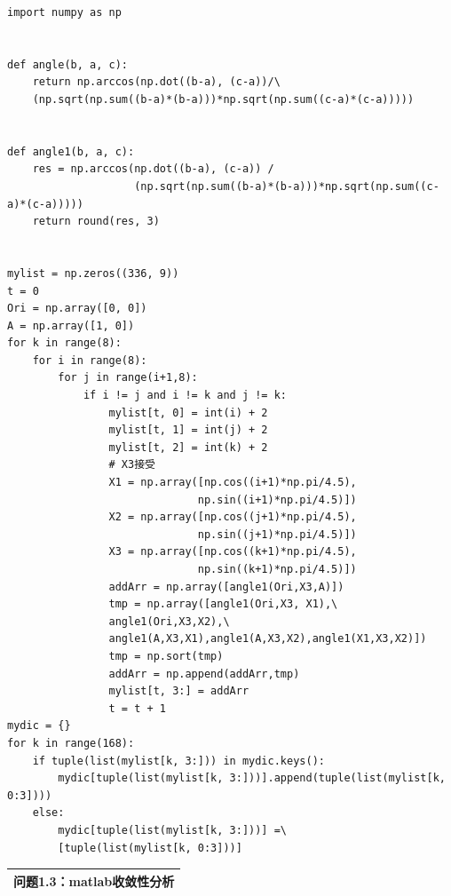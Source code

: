 \documentclass{my_paper}
\begin{document}
\begin{lstlisting}
import numpy as np


def angle(b, a, c):
    return np.arccos(np.dot((b-a), (c-a))/\
    (np.sqrt(np.sum((b-a)*(b-a)))*np.sqrt(np.sum((c-a)*(c-a)))))


def angle1(b, a, c):
    res = np.arccos(np.dot((b-a), (c-a)) /
                    (np.sqrt(np.sum((b-a)*(b-a)))*np.sqrt(np.sum((c-a)*(c-a)))))
    return round(res, 3)


mylist = np.zeros((336, 9))
t = 0
Ori = np.array([0, 0])
A = np.array([1, 0])
for k in range(8):
    for i in range(8):
        for j in range(i+1,8):
            if i != j and i != k and j != k:
                mylist[t, 0] = int(i) + 2
                mylist[t, 1] = int(j) + 2
                mylist[t, 2] = int(k) + 2
                # X3接受
                X1 = np.array([np.cos((i+1)*np.pi/4.5),
                              np.sin((i+1)*np.pi/4.5)])
                X2 = np.array([np.cos((j+1)*np.pi/4.5),
                              np.sin((j+1)*np.pi/4.5)])
                X3 = np.array([np.cos((k+1)*np.pi/4.5),
                              np.sin((k+1)*np.pi/4.5)])
                addArr = np.array([angle1(Ori,X3,A)])
                tmp = np.array([angle1(Ori,X3, X1),\ 
                angle1(Ori,X3,X2),\
                angle1(A,X3,X1),angle1(A,X3,X2),angle1(X1,X3,X2)])
                tmp = np.sort(tmp)
                addArr = np.append(addArr,tmp)
                mylist[t, 3:] = addArr
                t = t + 1
mydic = {}
for k in range(168):
    if tuple(list(mylist[k, 3:])) in mydic.keys():
        mydic[tuple(list(mylist[k, 3:]))].append(tuple(list(mylist[k, 0:3])))
    else:
        mydic[tuple(list(mylist[k, 3:]))] =\
        [tuple(list(mylist[k, 0:3]))]

\end{lstlisting}
\begin{table}[htbp]
    \centering
    \begin{tabular}{|p{14.0cm}|}
    \hline
    \textbf{问题1.3：matlab收敛性分析} \\ %
    \hline
    \end{tabular}
\end{table}
\end{document}
